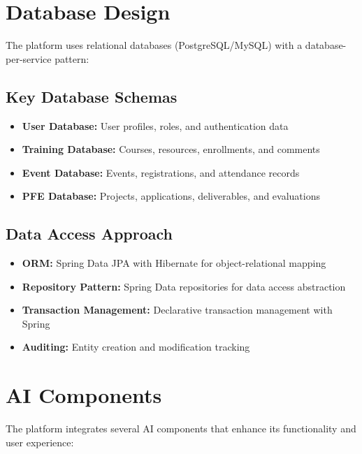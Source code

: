 \documentclass[12pt,a4paper]{report}
\begin{document}
\section{Database Design}

The platform uses relational databases (PostgreSQL/MySQL) with a database-per-service pattern:

\subsection{Key Database Schemas}

\begin{itemize}
    \item \textbf{User Database:} User profiles, roles, and authentication data

    \item \textbf{Training Database:} Courses, resources, enrollments, and comments

    \item \textbf{Event Database:} Events, registrations, and attendance records

    \item \textbf{PFE Database:} Projects, applications, deliverables, and evaluations
\end{itemize}

\subsection{Data Access Approach}

\begin{itemize}
    \item \textbf{ORM:} Spring Data JPA with Hibernate for object-relational mapping
    \item \textbf{Repository Pattern:} Spring Data repositories for data access abstraction
    \item \textbf{Transaction Management:} Declarative transaction management with Spring
    \item \textbf{Auditing:} Entity creation and modification tracking
\end{itemize}

\section{AI Components}

The platform integrates several AI components that enhance its functionality and user experience:
\end{document}
